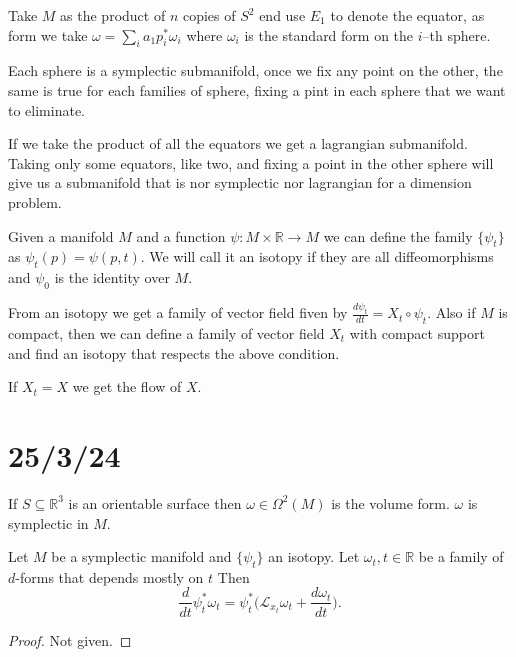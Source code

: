 \documentclass[misc]{subfiles}
\begin{document}
\begin{Exp}
    Take $M$ as the product of $n$ copies of $S^2$ end use $E_1$ to denote the equator, as form we take $\omega=\sum_i a_1 p^\ast_i \omega_i$ where $\omega_i$ is the standard form on the $i$--th sphere.

    Each sphere is a symplectic submanifold, once we fix any point on the other, the same is true for each families of sphere, fixing a pint in each sphere that we want to eliminate.

    If we take the product of all the equators we get a lagrangian submanifold. Taking only some equators, like two, and fixing a point in the other sphere will give us a submanifold that is nor symplectic nor lagrangian for a dimension problem.
\end{Exp}

\begin{Dfn}
    Given a manifold $M$ and a function $\psi: M \times \mathbb{R} \rightarrow M$ we can define the family $\{\psi_t\}$ as $\psi_t(p)=\psi(p,t)$. We will call it an isotopy if they are all diffeomorphisms and $\psi_0$ is the identity over $M$.

    From an isotopy we get a family of vector field fiven by $\frac{d\psi_t}{dt}=X_t \circ \psi_t$. Also if $M$ is compact, then we can define a family of vector field $X_t$ with compact support and find an isotopy that respects the above condition.

    If $X_t=X$ we get the flow of $X$.
\end{Dfn}


\section*{25/3/24}\label{Sec: }

    If $S\subseteq \mathbb{R}^3$ is an orientable surface then $\omega\in\Omega^2(M)$ is the volume form. $\omega$ is symplectic in $M$.

\begin{Exp}
\end{Exp}

\begin{Thm}
    Let $M$ be a symplectic manifold and $\{\psi_t\}$ an isotopy. Let $\omega_t, t\in\mathbb{R}$ be a family of $d$-forms that depends mostly on $t$ Then
    \[
        \frac{d}{dt}\psi_t^\ast\omega_t = \psi_t^\ast\bigg( \mathcal{L}_{x_t}\omega_t + \frac{d\omega_t}{dt}\bigg).
    \] 

    \begin{proof}
    
        Not given.
    \end{proof}
\end{Thm}
\end{document}
